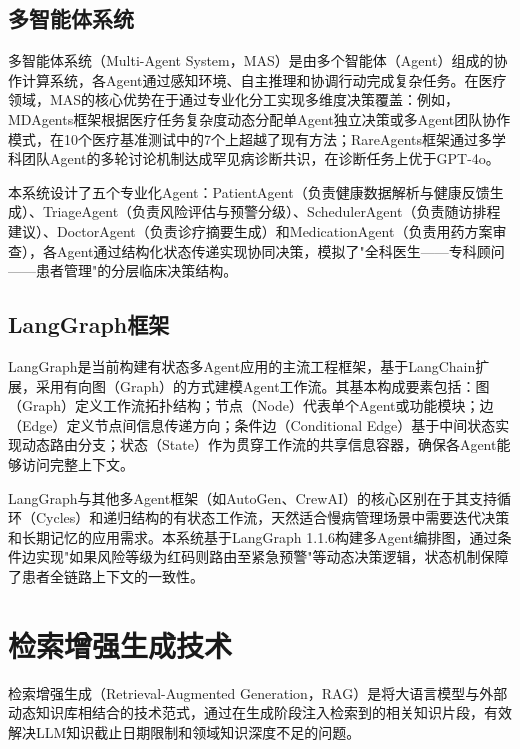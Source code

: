 \subsection{多智能体系统}

多智能体系统（Multi-Agent System，MAS）是由多个智能体（Agent）组成的协作计算系统，各Agent通过感知环境、自主推理和协调行动完成复杂任务\todocite{}。在医疗领域，MAS的核心优势在于通过专业化分工实现多维度决策覆盖：例如，MDAgents框架根据医疗任务复杂度动态分配单Agent独立决策或多Agent团队协作模式，在10个医疗基准测试中的7个上超越了现有方法\todocite{}；RareAgents框架通过多学科团队Agent的多轮讨论机制达成罕见病诊断共识，在诊断任务上优于GPT-4o。

本系统设计了五个专业化Agent：PatientAgent（负责健康数据解析与健康反馈生成）、TriageAgent（负责风险评估与预警分级）、SchedulerAgent（负责随访排程建议）、DoctorAgent（负责诊疗摘要生成）和MedicationAgent（负责用药方案审查），各Agent通过结构化状态传递实现协同决策，模拟了"全科医生——专科顾问——患者管理"的分层临床决策结构\todocite{}。

\subsection{LangGraph框架}

LangGraph是当前构建有状态多Agent应用的主流工程框架，基于LangChain扩展，采用有向图（Graph）的方式建模Agent工作流\todocite{}。其基本构成要素包括：图（Graph）定义工作流拓扑结构；节点（Node）代表单个Agent或功能模块；边（Edge）定义节点间信息传递方向；条件边（Conditional Edge）基于中间状态实现动态路由分支；状态（State）作为贯穿工作流的共享信息容器，确保各Agent能够访问完整上下文。

LangGraph与其他多Agent框架（如AutoGen、CrewAI）的核心区别在于其支持循环（Cycles）和递归结构的有状态工作流，天然适合慢病管理场景中需要迭代决策和长期记忆的应用需求\todocite{}。本系统基于LangGraph 1.1.6构建多Agent编排图，通过条件边实现"如果风险等级为红码则路由至紧急预警"等动态决策逻辑，状态机制保障了患者全链路上下文的一致性。

\section{检索增强生成技术}

检索增强生成（Retrieval-Augmented Generation，RAG）是将大语言模型与外部动态知识库相结合的技术范式，通过在生成阶段注入检索到的相关知识片段，有效解决LLM知识截止日期限制和领域知识深度不足的问题\todocite{}。

